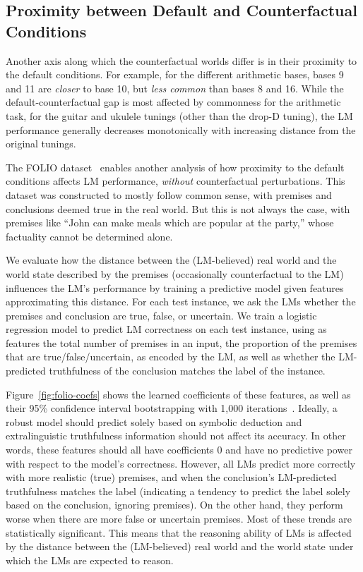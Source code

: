 \subsection{Proximity between Default and Counterfactual Conditions} \label{sec:analysis-world-realness}

Another axis along which the counterfactual worlds differ is in their proximity to the default conditions.
For example, for the different arithmetic bases, bases 9 and 11 are \emph{closer} to base 10, but \emph{less common} than bases 8 and 16.
While the default-counterfactual gap is most affected by commonness for the arithmetic task,
for the guitar and ukulele tunings (other than the drop-D tuning), the LM performance  generally decreases monotonically with increasing distance from the original tunings.

The FOLIO dataset~\citep{han2022folio} enables another analysis of how proximity to the default conditions affects LM performance, \emph{without} counterfactual perturbations. This dataset was constructed to mostly follow common sense, with premises and conclusions deemed true in the real world. But this is not always the case, with premises like ``John can make meals which are popular at the party,'' whose factuality cannot be determined alone. 

We evaluate how the distance between the (LM-believed) real world and the world state described by the premises (occasionally counterfactual to the LM) influences the LM's performance by training a predictive model given features approximating this distance.
For each test instance, we ask the LMs whether the premises and conclusion are true, false, or uncertain. We train a logistic regression model to predict LM correctness on each test instance, using as features the total number of premises in an input, the proportion of the premises that are true/false/uncertain, as encoded by the LM, as well as whether the LM-predicted truthfulness of the conclusion matches the label of the instance. %

Figure~\ref{fig:folio-coefs} shows the learned coefficients of these features, as well as their 95\% confidence interval bootstrapping with 1,000 iterations~\citep{EfroTibs93}.
Ideally, a robust model should predict solely based on symbolic deduction and extralinguistic truthfulness information should not affect its accuracy. In other words, these features should all have coefficients 0 and have no predictive power with respect to the model's correctness. However, all LMs predict more correctly with more realistic (true) premises, and when the conclusion's LM-predicted truthfulness matches the label (indicating a tendency to predict the label solely based on the conclusion, ignoring premises). On the other hand, they perform worse when there are more false or uncertain premises.
Most of these trends are statistically significant. 
This means that the reasoning ability of LMs is affected by the distance between the (LM-believed) real world and the world state under which the LMs are expected to reason.

